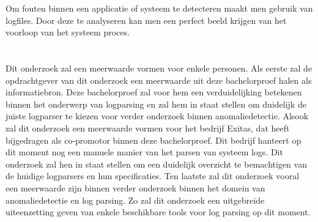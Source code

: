 Om fouten binnen een applicatie of systeem te detecteren maakt men gebruik van logfiles. Door deze te analyseren kan men een perfect beeld krijgen van het voorloop van het systeem proces.

\section{}
\label{sec:probleemstelling}


Dit onderzoek zal een meerwaarde vormen voor enkele personen. Als eerste zal de opdrachtgever van dit onderzoek een meerwaarde uit deze bachelorproef halen als informatiebron. Deze bachelorproef zal voor hem een verduidelijking betekenen binnen het onderwerp van logparsing en zal hem in staat stellen om duidelijk de juiste logparser te kiezen voor verder onderzoek binnen anomaliedetectie. Alsook zal dit onderzoek een meerwaarde vormen voor het bedrijf Exitas, dat heeft bijgedragen als co-promotor binnen deze bachelorproef. Dit bedrijf hanteert op dit moment nog een manuele manier van het parsen van systeem logs. Dit onderzoek zal hen in staat stellen om een duidelijk overzicht te bemachtigen van de huidige logparsers en hun specificaties. Ten laatste zal dit onderzoek vooral een meerwaarde zijn binnen verder onderzoek binnen het domein van anomaliedetectie en log parsing. Zo zal dit onderzoek een uitgebreide uiteenzetting geven van enkele beschikbare tools voor log parsing op dit moment. 


\section{}
\label{sec:onderzoeksvraag}


